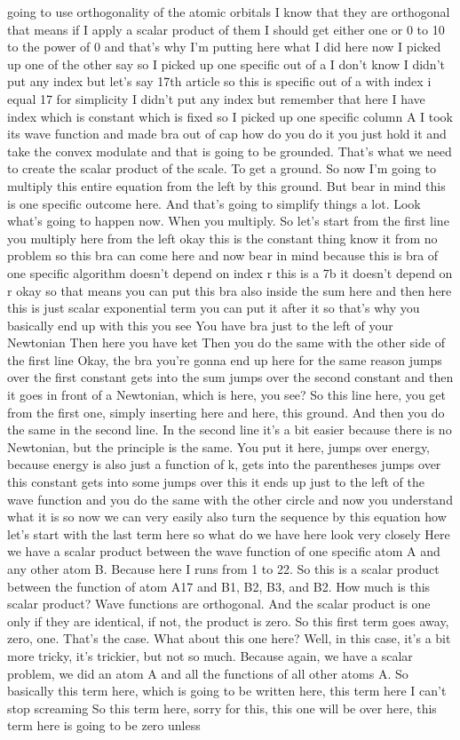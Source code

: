going to use orthogonality of the atomic orbitals I know that they are orthogonal that means if I apply a scalar product of them I should get either one or 0 to 10 to the power of 0 and that's why I'm putting here what I did here now I picked up one of the other say so I picked up one specific out of a I don't know I didn't put any index but let's say 17th article so this is specific out of a with index i equal 17 for simplicity I didn't put any index but remember that here I have index which is constant which is fixed so I picked up one specific column A I took its wave function and made bra out of cap how do you do it you just hold it and take the convex modulate and that is going to be grounded. That's what we need to create the scalar product of the scale. To get a ground. So now I'm going to multiply this entire equation from the left by this ground. But bear in mind this is one specific outcome here. And that's going to simplify things a lot. Look what's going to happen now. When you multiply. So let's start from the first line you multiply here from the left okay this is the constant thing know it from no problem so this bra can come here and now bear in mind because this is bra of one specific algorithm doesn't depend on index r this is a 7b it doesn't depend on r okay so that means you can put this bra also inside the sum here and then here this is just scalar exponential term you can put it after it so that's why you basically end up with this you see You have bra just to the left of your Newtonian Then here you have ket Then you do the same with the other side of the first line Okay, the bra you're gonna end up here for the same reason jumps over the first constant gets into the sum jumps over the second constant and then it goes in front of a Newtonian, which is here, you see? So this line here, you get from the first one, simply inserting here and here, this ground. And then you do the same in the second line. In the second line it's a bit easier because there is no Newtonian, but the principle is the same. You put it here, jumps over energy, because energy is also just a function of k, gets into the parentheses jumps over this constant gets into some jumps over this it ends up just to the left of the wave function and you do the same with the other circle and now you understand what it is so now we can very easily also turn the sequence by this equation how let's start with the last term here so what do we have here look very closely Here we have a scalar product between the wave function of one specific atom A and any other atom B. Because here I runs from 1 to 22. So this is a scalar product between the function of atom A17 and B1, B2, B3, and B2. How much is this scalar product? Wave functions are orthogonal. And the scalar product is one only if they are identical, if not, the product is zero. So this first term goes away, zero, one. That's the case. What about this one here? Well, in this case, it's a bit more tricky, it's trickier, but not so much. Because again, we have a scalar problem, we did an atom A and all the functions of all other atoms A. So basically this term here, which is going to be written here, this term here I can't stop screaming So this term here, sorry for this, this one will be over here, this term here is going to be zero unless 
